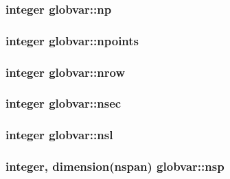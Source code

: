 \subsubsection[{np}]{\setlength{\rightskip}{0pt plus 5cm}integer globvar\+::np}\label{namespaceglobvar_ab80f0f7f25dc40712c12c67edf2c7112}
\hypertarget{namespaceglobvar_aa41d6163f0ff719597e6db196ee482eb}{}
\subsubsection[{npoints}]{\setlength{\rightskip}{0pt plus 5cm}integer globvar\+::npoints}\label{namespaceglobvar_aa41d6163f0ff719597e6db196ee482eb}
\hypertarget{namespaceglobvar_a800cf6c01b61ed57a87bd315e1d9efa2}{}
\subsubsection[{nrow}]{\setlength{\rightskip}{0pt plus 5cm}integer globvar\+::nrow}\label{namespaceglobvar_a800cf6c01b61ed57a87bd315e1d9efa2}
\hypertarget{namespaceglobvar_a4bcc489e884542bc5eb30f17d5773278}{}
\subsubsection[{nsec}]{\setlength{\rightskip}{0pt plus 5cm}integer globvar\+::nsec}\label{namespaceglobvar_a4bcc489e884542bc5eb30f17d5773278}
\hypertarget{namespaceglobvar_a5ffdff1f4afd2fecd622bee9fbe37442}{}
\subsubsection[{nsl}]{\setlength{\rightskip}{0pt plus 5cm}integer globvar\+::nsl}\label{namespaceglobvar_a5ffdff1f4afd2fecd622bee9fbe37442}
\hypertarget{namespaceglobvar_adba3978116210cab68543d6d1bed200e}{}
\subsubsection[{nsp}]{\setlength{\rightskip}{0pt plus 5cm}integer, dimension({\bf nspan}) globvar\+::nsp}\label{namespaceglobvar_adba3978116210cab68543d6d1bed200e}
\hypertarget{namespaceglobvar_a2102305906fb17109fa9be746d11cf64}{}
